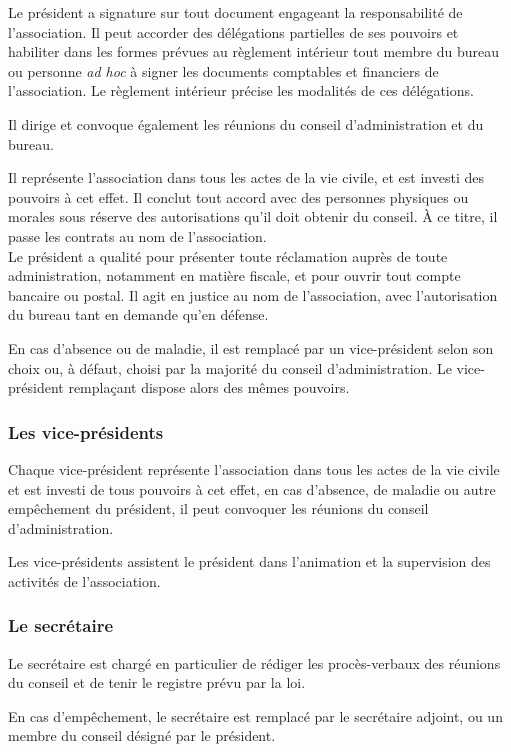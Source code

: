 \documentclass[a4wide,12pt]{scrartcl}
\begin{document}
Le président a signature sur tout document engageant la responsabilité
de l'association. Il peut accorder des délégations partielles de ses
pouvoirs et habiliter dans les formes prévues au règlement intérieur
tout membre du bureau ou personne \textit{ad hoc} à signer les documents
comptables et financiers de l'association. Le règlement intérieur
précise les modalités de ces délégations.

Il dirige et convoque également les réunions du conseil
d'administration et du bureau.

Il représente l'association dans tous les actes de la vie civile, et
est investi des pouvoirs à cet effet. Il conclut tout accord avec des
personnes physiques ou morales sous réserve des autorisations qu'il
doit obtenir du conseil. À ce titre, il passe les contrats au nom de
l'association.\\
Le président a qualité pour présenter toute réclamation
auprès de toute administration, notamment en matière fiscale, et pour
ouvrir tout compte bancaire ou postal. Il agit en justice au nom de
l'association, avec l'autorisation du bureau tant en demande qu'en
défense.
 
En cas d'absence ou de maladie, il est remplacé par un vice-président
selon son choix ou, à défaut, choisi par la majorité du conseil
d'administration. Le vice-président remplaçant dispose alors des
mêmes pouvoirs.

\subsubsection*{Les vice-présidents}

Chaque vice-président représente l'association dans tous les actes de
la vie civile et est investi de tous pouvoirs à cet effet, en cas
d'absence, de maladie ou autre empêchement du président, il peut
convoquer les réunions du conseil d'administration.

Les vice-présidents assistent le président dans l'animation et la
supervision des activités de l'association.

\subsubsection*{Le secrétaire}

Le secrétaire est chargé en particulier de rédiger les procès-verbaux
des réunions du conseil et de tenir le registre prévu par la loi.

En cas d'empêchement, le secrétaire est remplacé par le secrétaire
adjoint, ou un membre du conseil désigné par le président.
\end{document}
